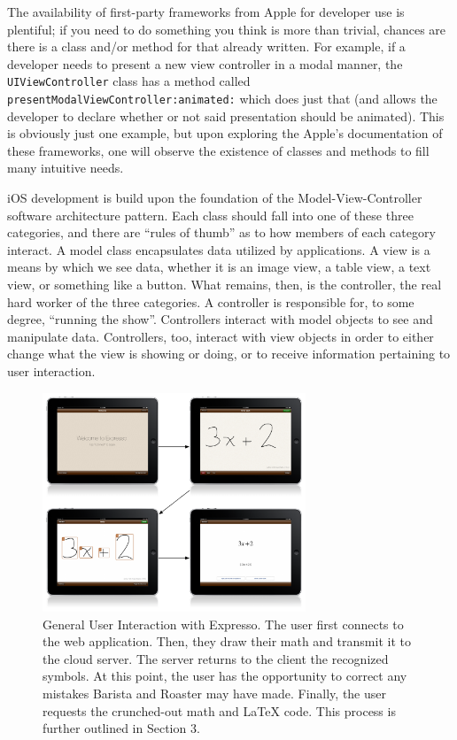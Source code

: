 \documentclass{acm_proc_article-sp}
\begin{document}
The availability of first-party frameworks from Apple for developer use is plentiful; if you need to do something you think is more than trivial, chances are there is a class and/or method for that already written. For example, if a developer needs to present a new view controller in a modal manner, the \texttt{UIViewController} class has a method called \texttt{presentModalViewController:animated:} which does just that (and allows the developer to declare whether or not said presentation should be animated). This is obviously just one example, but upon exploring the Apple's documentation of these frameworks, one will observe the existence of classes and methods to fill many intuitive needs.

iOS development is build upon the foundation of the Model-View-Controller software architecture pattern. Each class should fall into one of these three categories, and there are ``rules of thumb'' as to how members of each category interact. A model class encapsulates data utilized by applications. A view is a means by which we see data, whether it is an image view, a table view, a text view, or something like a button. What remains, then, is the controller, the real hard worker of the three categories. A controller is responsible for, to some degree, ``running the show''. Controllers interact with model objects to see and manipulate data. Controllers, too, interact with view objects in order to either change what the view is showing or doing, or to receive information pertaining to user interaction.

\begin{figure}
\centering
\includegraphics[width=0.7\textwidth]{user_workflow.pdf}
\caption{General User Interaction with Expresso. The user first connects to the web application. Then, they draw their math and transmit it to the cloud server. The server returns to the client the recognized symbols. At this point, the user has the opportunity to correct any mistakes Barista and Roaster may have made. Finally, the user requests the crunched-out math and \LaTeX{} code. This process is further outlined in Section 3.}
\label{fig:user_workflow}
\end{figure}
\end{document}
